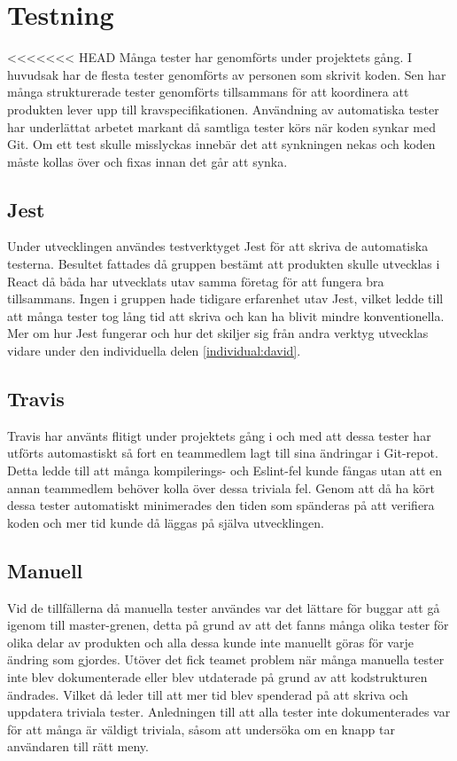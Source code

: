 \section{Testning}
<<<<<<< HEAD
Många tester har genomförts under projektets gång. I huvudsak har de flesta tester genomförts av personen som skrivit koden. Sen har många strukturerade tester genomförts tillsammans för att koordinera att produkten lever upp till kravspecifikationen. Användning av automatiska tester har underlättat arbetet markant då samtliga tester körs när koden synkar med Git. Om ett test skulle misslyckas innebär det att synkningen nekas och koden måste kollas över och fixas innan det går att synka.

\subsection{Jest}
Under utvecklingen användes testverktyget Jest för att skriva de automatiska testerna. Besultet fattades då gruppen bestämt att produkten skulle utvecklas i React då båda har utvecklats utav samma företag för att fungera bra tillsammans. Ingen i gruppen hade tidigare erfarenhet utav Jest, vilket ledde till att många tester tog lång tid att skriva och kan ha blivit mindre konventionella. Mer om hur Jest fungerar och hur det skiljer sig från andra verktyg utvecklas vidare under den individuella delen \ref{individual:david}.

\subsection{Travis}
Travis har använts flitigt under projektets gång i och med att dessa tester har utförts automastiskt så fort en teammedlem lagt till sina ändringar i Git-repot. Detta ledde till att många kompilerings- och Eslint-fel kunde fångas utan att en annan teammedlem behöver kolla över dessa triviala fel. Genom att då ha kört dessa tester automatiskt minimerades den tiden som spänderas på att verifiera koden och mer tid kunde då läggas på själva utvecklingen. 

\subsection{Manuell}
Vid de tillfällerna då manuella tester användes var det lättare för buggar att gå igenom till master-grenen, detta på grund av att det fanns många olika tester för olika delar av produkten och alla dessa kunde inte manuellt göras för varje ändring som gjordes. Utöver det fick teamet problem när många manuella tester inte blev dokumenterade eller blev utdaterade på grund av att kodstrukturen ändrades. Vilket då leder till att mer tid blev spenderad på att skriva och uppdatera triviala tester. Anledningen till att alla tester inte dokumenterades var för att många är väldigt triviala, såsom att undersöka om en knapp tar användaren till rätt meny. 
